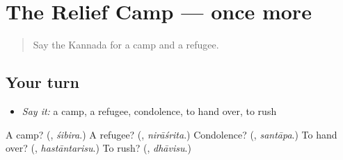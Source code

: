 \section[(dialogue)]{The Relief Camp — once more}

\label{lesson:KA-R375-review-final-375}



\begin{quote}
Say the Kannada for a camp and a refugee.
\end{quote}

\subsection*{Your turn}
\begin{itemize}
\raggedright
  \item \emph{Say it:} a camp, a refugee, condolence, to hand over, to rush
\end{itemize}

\begin{tcolorbox}[breakable,colback=teal!4,colframe=teal!35!black,title={Before you move on}]
A camp? (\textbf{}, \emph{śibira}.) A refugee? (\textbf{}, \emph{nirāśrita}.) Condolence? (\textbf{}, \emph{santāpa}.) To hand over? (\textbf{}, \emph{hastāntarisu}.) To rush? (\textbf{}, \emph{dhāvisu}.)
\end{tcolorbox}
